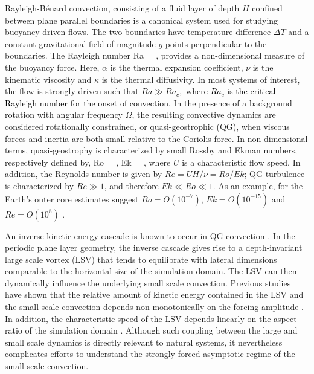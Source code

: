 Rayleigh-B\'enard convection, consisting of a fluid layer of depth $H$ confined between plane parallel boundaries is a canonical system used for studying buoyancy-driven flows. The two boundaries have temperature difference $\Delta T$ and a constant gravitational field of magnitude $g$ points perpendicular to the boundaries. The Rayleigh number 
\be
Ra = ,
\ee
provides a non-dimensional measure of the buoyancy force. Here, $\alpha$ is the thermal expansion coefficient, $\nu$ is the kinematic viscosity and $\kappa$ is the thermal diffusivity. In most systems of interest, the flow is strongly driven such that \textcolor{black}{$Ra \gg Ra_{c},$ where $Ra_c$ is the critical Rayleigh number for the onset of convection.} 
In the presence of a background rotation with angular frequency $\Omega$, the resulting convective dynamics are considered rotationally constrained, or quasi-geostrophic (QG), when viscous forces and inertia are both small relative to the Coriolis force. In non-dimensional terms, quasi-geostrophy is characterized by small Rossby and Ekman numbers, respectively defined by,
\be
Ro = , \qquad Ek = ,
\ee
where $U$ is a characteristic flow speed. In addition, the Reynolds number is given by $Re = U H/ \nu = Ro/Ek$; QG turbulence is characterized by $Re \gg 1$, and therefore $Ek \ll Ro \ll 1$. As an example, for the Earth's outer core estimates suggest $Ro = O(10^{-7})$, $Ek = O(10^{-15})$ and $Re = O(10^8)$ \citep[e.g.][]{pR13}. 


An inverse kinetic energy cascade is known to occur in QG convection \citep{kJ12,aR14,bF14,cG14,sM21}. In the periodic plane layer geometry, the inverse cascade gives rise to a depth-invariant large scale vortex (LSV) that tends to equilibrate with lateral dimensions comparable to the horizontal size of the simulation domain. The LSV can then dynamically influence the underlying small scale convection. Previous studies have shown that the relative amount of kinetic energy contained in the LSV and the small scale convection depends non-monotonically on the forcing amplitude \citep{cG14,sM21}. In addition, the characteristic speed of the LSV depends linearly on the aspect ratio of the simulation domain \citep{sM21,jN22}. Although such coupling between the large and small scale dynamics is directly relevant to natural systems, it nevertheless complicates efforts to understand the strongly forced asymptotic regime of the small scale convection. 



